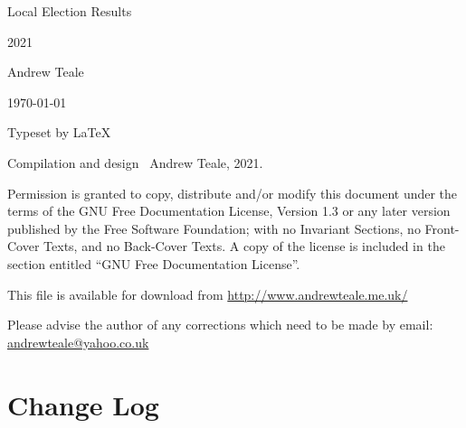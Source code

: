 \documentclass[a4paper,openany]{book}
\begin{document}

\begin{titlepage}

\begin{center}

\Huge Local Election Results

2021

\bigskip

\Large Andrew Teale

\vfill

\newcommand\versionno{0.10.1}


\today

\end{center}

\end{titlepage}


\begin{center}

\bigskip

Typeset by \LaTeX{}

\bigskip

Compilation and design \textcopyright\ Andrew Teale, 2021.

 Permission is granted to copy, distribute and/or modify this document
 under the terms of the GNU Free Documentation License, Version 1.3
 or any later version published by the Free Software Foundation;
 with no Invariant Sections, no Front-Cover Texts, and no Back-Cover Texts.
 A copy of the license is included in the section entitled ``GNU
 Free Documentation License''.

\bigskip

This file is available for download from
\url{http://www.andrewteale.me.uk/}

\bigskip

Please advise the author of any corrections which need to be made by
email: \url{andrewteale@yahoo.co.uk}

\vfill
\end{center}

\section*{Change Log}


%
\end{document}
